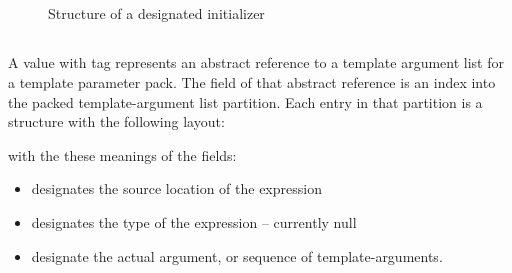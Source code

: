 

\subsection{}
\label{sec:ifc:ExprSort:DesignatedInitializer}

\begin{figure}[H]
	\centering
	\caption{Structure of a designated initializer}
	\label{fig:ifc-designated-initializer-structure}
\end{figure}


\subsection{}
\label{sec:ifc:ExprSort:PackedTemplateArguments}

A  value with tag  represents an
abstract reference to a template argument list for a template parameter pack.  The 
 field of that abstract reference is an index into the packed template-argument
list partition.  Each entry in that partition is a structure with the following layout:
%
\begin{figure}[H]
	\centering
\end{figure}
%
with the these meanings of the fields:
\begin{itemize}
	\item {} designates the source location of the expression
	\item {} designates the type of the expression -- currently null
	\item {} designate the actual argument, or sequence of template-arguments.
\end{itemize}

